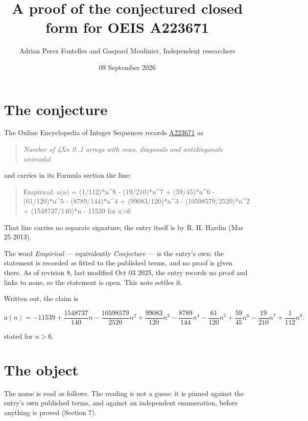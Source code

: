 \documentclass[11pt]{article}
\title{A proof of the conjectured closed form for OEIS A223671}
\author{Adrian Perez Fontelles and Gaspard Moulinier, Independent researchers}
\date{09 September 2026}
\theoremstyle{definition}
\begin{document}
\maketitle
\section{The conjecture}

The Online Encyclopedia of Integer Sequences records \href{https://oeis.org/A223671}{A223671} as

\begin{quote}\itshape Number of 4Xn 0..1 arrays with rows, diagonals and antidiagonals unimodal\end{quote}

and carries in its Formula section the line:

\begin{quote}\ttfamily Empirical: a(n) = (1/112)*n\textasciicircum{}8 - (19/210)*n\textasciicircum{}7 + (59/45)*n\textasciicircum{}6 - (61/120)*n\textasciicircum{}5 - (8789/144)*n\textasciicircum{}4 + (99083/120)*n\textasciicircum{}3 - (10598579/2520)*n\textasciicircum{}2 + (1548737/140)*n - 11539 for n>6\end{quote}

That line carries no separate signature; the entry itself is by R. H. Hardin (Mar 25 2013).

The word {\itshape Empirical} --- equivalently {\itshape Conjecture} --- is the entry's own: the statement is recorded as fitted to the published terms, and no proof is given there. As of revision 8, last modified Oct 03 2025, the entry records no proof and links to none, so the statement is open. This note settles it.

Written out, the claim is

\[a(n) = -11539 + \frac{1548737}{140}n - \frac{10598579}{2520}n^{2} + \frac{99083}{120}n^{3} - \frac{8789}{144}n^{4} - \frac{61}{120}n^{5} + \frac{59}{45}n^{6} - \frac{19}{210}n^{7} + \frac{1}{112}n^{8}.\]

stated for $n > 6$.

\section{The object}

The name is read as follows. The reading is not a guess: it is pinned against the entry's own published terms, and against an independent enumeration, before anything is proved (Section 7).
\end{document}
